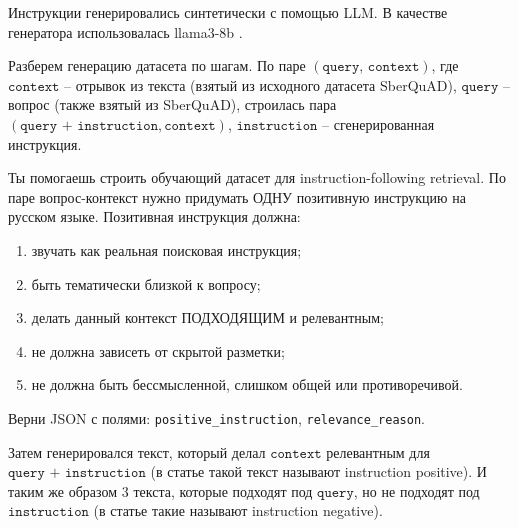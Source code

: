 \documentclass[12pt, a4paper, oneside]{article}
\begin{document}
Инструкции генерировались синтетически с помощью LLM. В 
качестве генератора использовалась llama3-8b \cite{llama3modelcard}.

Разберем генерацию датасета по шагам. 
По паре $(\texttt{query, context})$, где
$\texttt{context}$ -- отрывок из текста (взятый из исходного датасета SberQuAD), 
$\texttt{query}$ -- вопрос (также взятый из SberQuAD), строилась пара $(\texttt{query + instruction}, 
\texttt{context})$, $\texttt{instruction}$ 
-- сгенерированная инструкция. 

\begin{promptposbox}
\small
Ты помогаешь строить обучающий датасет для instruction-following retrieval.
По паре вопрос-контекст нужно придумать ОДНУ позитивную инструкцию на русском языке.
Позитивная инструкция должна:
\begin{enumerate}
    \item звучать как реальная поисковая инструкция;
    \item быть тематически близкой к вопросу;
    \item делать данный контекст ПОДХОДЯЩИМ и релевантным;
    \item не должна зависеть от скрытой разметки;
    \item не должна быть бессмысленной, слишком общей или противоречивой.
\end{enumerate}
Верни JSON с полями: \texttt{positive\_instruction}, \texttt{relevance\_reason}.
\end{promptposbox}

Затем генерировался текст, который делал $\texttt{context}$ 
релевантным для $\texttt{query + instruction}$ (в статье такой текст называют instruction positive). 
И таким же образом 3 текста, которые подходят под $\texttt{query}$, но не подходят под 
$\texttt{instruction}$ (в статье такие называют instruction negative). 
\end{document}
